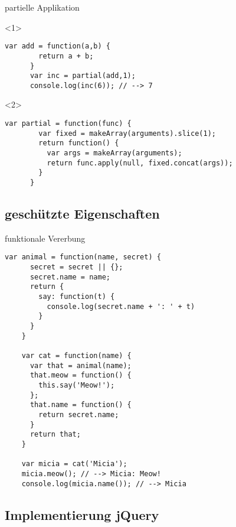 \begin{frame}[fragile]{partielle Applikation}
  \begin{onlyenv}<1>
    \begin{lstlisting}[gobble=6]
      var add = function(a,b) {
        return a + b;
      }
      var inc = partial(add,1);
      console.log(inc(6)); // --> 7
    \end{lstlisting}
  \end{onlyenv}
  
  \begin{onlyenv}<2>
    \begin{lstlisting}[gobble=6]
      var partial = function(func) {
        var fixed = makeArray(arguments).slice(1);
        return function() {
          var args = makeArray(arguments);
          return func.apply(null, fixed.concat(args));
        }
      }
    \end{lstlisting}
  \end{onlyenv}
\end{frame}

\subsection{geschützte Eigenschaften}

\begin{frame}[fragile]{funktionale Vererbung}
  \begin{lstlisting}[gobble=4]
    var animal = function(name, secret) {
      secret = secret || {};
      secret.name = name;
      return {
        say: function(t) {
          console.log(secret.name + ': ' + t)
        }
      }
    }
    
    var cat = function(name) {
      var that = animal(name);
      that.meow = function() {
        this.say('Meow!');
      };
      that.name = function() {
        return secret.name;
      }
      return that;
    }
    
    var micia = cat('Micia');
    micia.meow(); // --> Micia: Meow!
    console.log(micia.name()); // --> Micia
  \end{lstlisting}
\end{frame}

\subsection{Implementierung jQuery}

